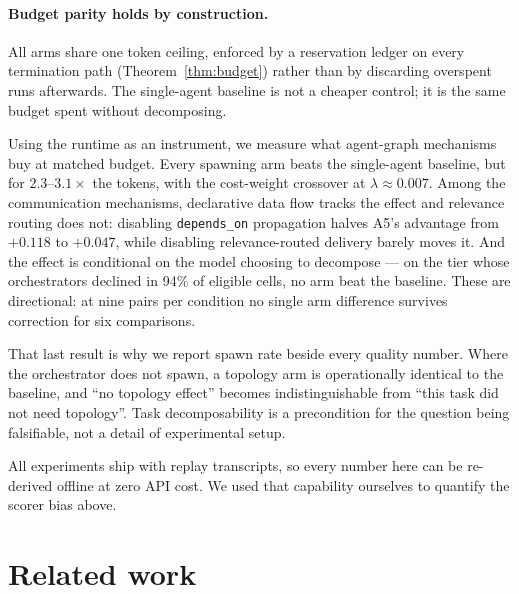 \documentclass[10pt]{article}
\begin{document}
\paragraph{Budget parity holds by construction.}
All arms share one token ceiling, enforced by a reservation ledger on every
termination path (Theorem~\ref{thm:budget}) rather than by discarding overspent
runs afterwards. The single-agent baseline is not a cheaper control; it is the
same budget spent without decomposing.

Using the runtime as an instrument, we measure what agent-graph mechanisms buy
at matched budget. Every spawning arm beats the single-agent baseline, but for
$2.3$--$3.1\times$ the tokens, with the cost-weight crossover at
$\lambda \approx 0.007$. Among the communication mechanisms, declarative data
flow tracks the effect and relevance routing does not: disabling
\texttt{depends\_on} propagation halves A5's advantage from $+0.118$ to
$+0.047$, while disabling relevance-routed delivery barely moves it. And the
effect is conditional on the model choosing to decompose --- on the tier whose
orchestrators declined in 94\% of eligible cells, no arm beat the baseline.
These are directional: at nine pairs per condition no single arm difference
survives correction for six comparisons.

That last result is why we report spawn rate beside every quality number. Where
the orchestrator does not spawn, a topology arm is operationally identical to the
baseline, and ``no topology effect'' becomes indistinguishable from ``this task
did not need topology''. Task decomposability is a precondition for the question
being falsifiable, not a detail of experimental setup.

All experiments ship with replay transcripts, so every number here can be
re-derived offline at zero API cost. We used that capability ourselves to
quantify the scorer bias above.

\section{Related work}
\label{sec:related}
\end{document}
